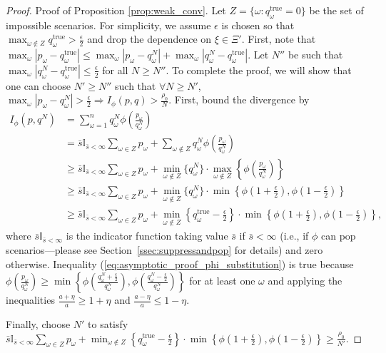 \documentclass[12pt]{article}
\newcommand{\qtrue}{q^{\text{true}}}
\theoremstyle{plain}
\theoremstyle{definition}
\theoremstyle{remark}
\begin{document}
\begin{proof}{\sc Proof of Proposition \ref{prop:weak_conv}.}
	Let $Z = \{\omega : \qtrue_\omega = 0\}$ be the set of impossible scenarios.
	For simplicity, we assume $\epsilon$ is chosen so that $\max_{\omega \notin Z} \qtrue_\omega > \frac{\epsilon}{2}$ and drop the dependence on $\xi \in \Xi'$.	
	First, note that $\max_\omega |p_\omega - \qtrue_\omega| \leq \max_\omega |p_\omega - q^N_\omega| + \max_\omega |q^N_\omega - \qtrue_\omega|$.
	Let $N''$ be such that $\max_\omega |q^N_\omega - \qtrue_\omega| \leq \frac{\epsilon}{2}$ for all $N \geq N''$.
	To complete the proof, we will show that one can choose $N' \geq N''$ such that $\forall N \geq N'$, $\max_\omega |p_\omega - q^N_\omega| > \frac{\epsilon}{2} \Rightarrow I_\phi(p,q) > \frac{\rho_0}{N}$.
	First, bound the divergence by
	\begin{align}
		I_{\phi}(p,q^N) & = \sum_{\omega=1}^n q^N_\omega \phi\left( \frac{p_\omega}{q^N_\omega} \right) \nonumber \\
		& = \bar{s} \mathbb{I}_{\bar{s} < \infty} \sum_{\omega \in Z} p_\omega + \sum_{\omega \notin Z} q^N_\omega \phi\left( \frac{p_\omega}{q^N_\omega} \right) \nonumber \\
		& \geq \bar{s} \mathbb{I}_{\bar{s} < \infty} \sum_{\omega \in Z} p_\omega + \min_{\omega \notin Z} \{q^N_\omega\} \cdot \max_{\omega \notin Z} \left\{ \phi \left( \frac{p_\omega}{q^N_\omega} \right) \right\} \nonumber \\
		& \geq \bar{s} \mathbb{I}_{\bar{s} < \infty} \sum_{\omega \in Z} p_\omega  + \min_{\omega \notin Z} \{q^N_\omega\} \cdot \min\left\{ \phi\left(1+\frac{\epsilon}{2}\right), \phi\left(1-\frac{\epsilon}{2}\right) \right\} \label{eq:asymptotic_proof_phi_substitution} \\
		& \geq \bar{s} \mathbb{I}_{\bar{s} < \infty} \sum_{\omega \in Z} p_\omega + \min_{\omega \notin Z} \left\{ \qtrue_\omega - \frac{\epsilon}{2} \right\} \cdot \min\left\{ \phi\left(1+\frac{\epsilon}{2}\right), \phi\left(1-\frac{\epsilon}{2}\right) \right\} \nonumber,
	\end{align}
	where $\bar{s}\mathbb{I}_{\bar{s} < \infty}$ is the indicator function taking value $\bar{s}$ if $\bar{s} < \infty$ (i.e., if $\phi$ can pop scenarios---please see Section~\ref{ssec:suppressandpop} for details) and zero otherwise.	
	Inequality (\ref{eq:asymptotic_proof_phi_substitution}) is true because $\phi \left( \frac{p_\omega}{q^N_\omega} \right) \geq \min\left\{ \phi\left( \frac{q^N_\omega+\tfrac{\epsilon}{2}}{q^N_\omega} \right), \phi\left( \frac{q^N_\omega-\tfrac{\epsilon}{2}}{q^N_\omega} \right) \right\}$ for at least one $\omega$ and applying the inequalities $\frac{a+\eta}{a} \geq 1 + \eta$ and $\frac{a-\eta}{a} \leq 1-\eta$.
	
	Finally, choose $N'$ to satisfy $\bar{s} \mathbb{I}_{\bar{s} < \infty} \sum_{\omega \in Z} p_\omega + \min_{\omega \notin Z} \left\{ \qtrue_\omega - \frac{\epsilon}{2} \right\} \cdot \min\left\{ \phi\left(1+\frac{\epsilon}{2}\right), \phi\left(1-\frac{\epsilon}{2}\right) \right\} \geq \frac{\rho_0}{N'}$.
	\Halmos
\end{proof}
\end{document}
